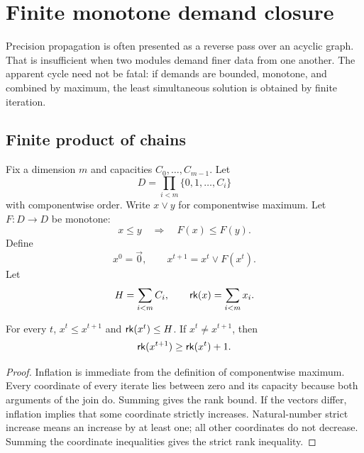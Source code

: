 \section{Finite monotone demand closure}
\label{sec:demand}

Precision propagation is often presented as a reverse pass over an acyclic graph.  That is insufficient when two modules demand finer data from one another.  The apparent cycle need not be fatal: if demands are bounded, monotone, and combined by maximum, the least simultaneous solution is obtained by finite iteration.

\subsection{Finite product of chains}

Fix a dimension \(m\) and capacities \(C_0,\ldots,C_{m-1}\).  Let
\[
  D=\prod_{i<m}\{0,1,\ldots,C_i\}
\]
with componentwise order.  Write \(x\vee y\) for componentwise maximum.  Let \(F:D\to D\) be monotone:
\begin{equation}
  x\leq y\quad\Longrightarrow\quad F(x)\leq F(y).
  \label{eq:demand-monotone}
\end{equation}
Define
\begin{equation}
  x^0=\vec 0,
  \qquad
  x^{t+1}=x^t\vee F(x^t).
  \label{eq:demand-iteration}
\end{equation}
Let
\begin{equation}
  H=\sum_{i<m}C_i,
  \qquad
  \mathsf{rk}(x)=\sum_{i<m}x_i.
  \label{eq:demand-rank}
\end{equation}

\begin{lemma}
\label{lem:demand-inflation}
For every \(t\), \(x^t\leq x^{t+1}\) and \(\mathsf{rk}(x^t)\leq H\).  If \(x^t\neq x^{t+1}\), then
\[
  \mathsf{rk}(x^{t+1})\geq \mathsf{rk}(x^t)+1.
\]
\end{lemma}

\begin{proof}
Inflation is immediate from the definition of componentwise maximum.  Every coordinate of every iterate lies between zero and its capacity because both arguments of the join do.  Summing gives the rank bound.  If the vectors differ, inflation implies that some coordinate strictly increases.  Natural-number strict increase means an increase by at least one; all other coordinates do not decrease.  Summing the coordinate inequalities gives the strict rank inequality.
\end{proof}

